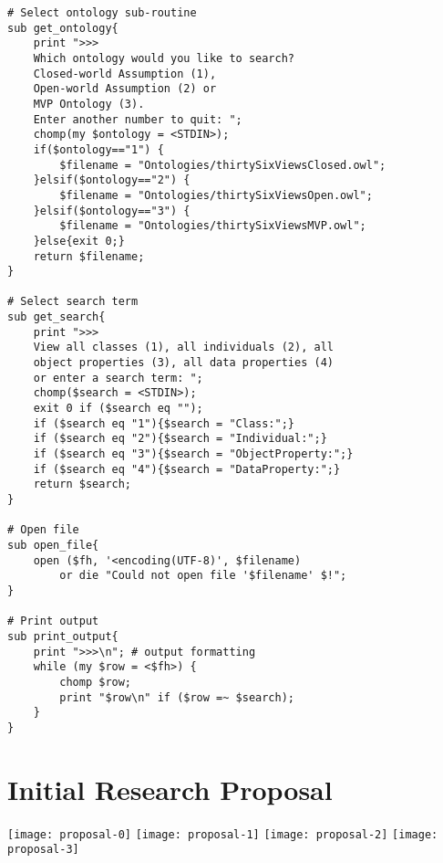 \documentclass[titlepage,a4paper,12pt,oneside]{book}
\begin{document}
\begin{appendices}
\begin{lstlisting}
# Select ontology sub-routine
sub get_ontology{
	print ">>>
	Which ontology would you like to search?
	Closed-world Assumption (1),
	Open-world Assumption (2) or
	MVP Ontology (3). 
	Enter another number to quit: ";
	chomp(my $ontology = <STDIN>);
	if($ontology=="1") {
		$filename = "Ontologies/thirtySixViewsClosed.owl";
	}elsif($ontology=="2") {
		$filename = "Ontologies/thirtySixViewsOpen.owl";
	}elsif($ontology=="3") { 
		$filename = "Ontologies/thirtySixViewsMVP.owl";
	}else{exit 0;}
	return $filename;
}

# Select search term 
sub get_search{
	print ">>>
	View all classes (1), all individuals (2), all
	object properties (3), all data properties (4)  
	or enter a search term: ";
	chomp($search = <STDIN>);
	exit 0 if ($search eq "");
	if ($search eq "1"){$search = "Class:";}
	if ($search eq "2"){$search = "Individual:";}
	if ($search eq "3"){$search = "ObjectProperty:";}
	if ($search eq "4"){$search = "DataProperty:";}
	return $search;
}

# Open file
sub open_file{
	open ($fh, '<encoding(UTF-8)', $filename)
		or die "Could not open file '$filename' $!";
}

# Print output
sub print_output{
	print ">>>\n"; # output formatting
	while (my $row = <$fh>) {
		chomp $row; 
		print "$row\n" if ($row =~ $search);
	}
}
\end{lstlisting}

\chapter{Initial Research Proposal}
\noindent
\texttt{[image: proposal-0]}
\newpage
\noindent
\texttt{[image: proposal-1]}
\newpage
\noindent
\texttt{[image: proposal-2]}
\newpage
\noindent
\texttt{[image: proposal-3]}

\end{appendices}
\end{document}
